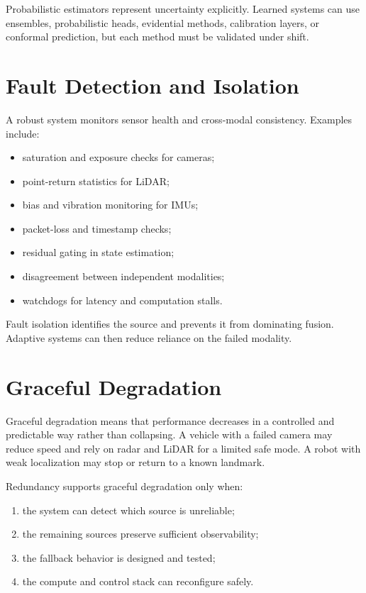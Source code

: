 Probabilistic estimators represent uncertainty explicitly. Learned systems can use ensembles, probabilistic heads, evidential methods, calibration layers, or conformal prediction, but each method must be validated under shift.

\section{Fault Detection and Isolation}

A robust system monitors sensor health and cross-modal consistency. Examples include:

\begin{itemize}
    \item saturation and exposure checks for cameras;
    \item point-return statistics for LiDAR;
    \item bias and vibration monitoring for IMUs;
    \item packet-loss and timestamp checks;
    \item residual gating in state estimation;
    \item disagreement between independent modalities;
    \item watchdogs for latency and computation stalls.
\end{itemize}

Fault isolation identifies the source and prevents it from dominating fusion. Adaptive systems can then reduce reliance on the failed modality.

\section{Graceful Degradation}

Graceful degradation means that performance decreases in a controlled and predictable way rather than collapsing. A vehicle with a failed camera may reduce speed and rely on radar and LiDAR for a limited safe mode. A robot with weak localization may stop or return to a known landmark.

Redundancy supports graceful degradation only when:

\begin{enumerate}[label=\arabic*.]
    \item the system can detect which source is unreliable;
    \item the remaining sources preserve sufficient observability;
    \item the fallback behavior is designed and tested;
    \item the compute and control stack can reconfigure safely.
\end{enumerate}

